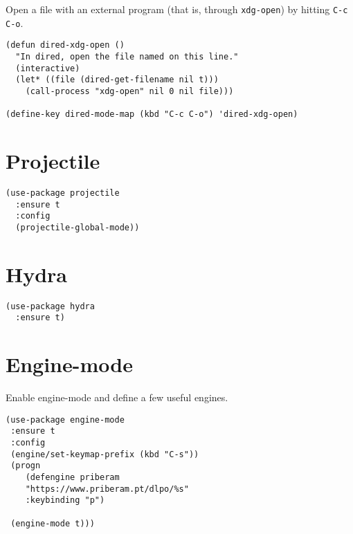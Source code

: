 \documentclass[11pt]{article}
\begin{document}
Open a file with an external program (that is, through \texttt{xdg-open}) by hitting
\texttt{C-c C-o}.

\begin{verbatim}
(defun dired-xdg-open ()
  "In dired, open the file named on this line."
  (interactive)
  (let* ((file (dired-get-filename nil t)))
    (call-process "xdg-open" nil 0 nil file)))

(define-key dired-mode-map (kbd "C-c C-o") 'dired-xdg-open)
\end{verbatim}
\section{Projectile}
\label{sec:org8378911}

\begin{verbatim}
(use-package projectile
  :ensure t
  :config
  (projectile-global-mode))
\end{verbatim}
\section{Hydra}
\label{sec:org9d67f6a}

\begin{verbatim}
(use-package hydra
  :ensure t)
\end{verbatim}
\section{Engine-mode}
\label{sec:org11ac996}

Enable engine-mode and define a few useful engines.

\begin{verbatim}
(use-package engine-mode
 :ensure t
 :config
 (engine/set-keymap-prefix (kbd "C-s"))
 (progn
    (defengine priberam
    "https://www.priberam.pt/dlpo/%s"
    :keybinding "p")

 (engine-mode t)))
\end{verbatim}
\end{document}
